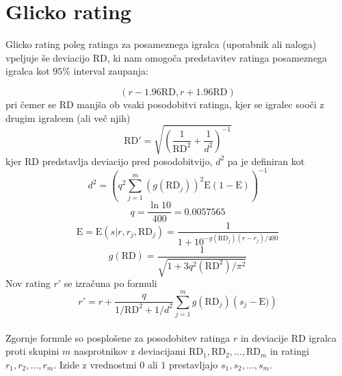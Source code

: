 \documentclass{IEEEtran}
\begin{document}
\section{Glicko rating}
\label{sec:glicko}
Glicko rating poleg ratinga za posameznega igralca (uporabnik ali naloga) vpeljuje še deviacijo $\mathrm{RD}$, ki nam omogoča predstavitev ratinga posameznega igralca kot $95\%$ interval zaupanja:

\begin{equation}
    \left ( r -1.96\mathrm{RD}, r +1.96\mathrm{RD} \right )
\end{equation}
pri čemer se $\mathrm{RD}$ manjša ob vsaki posodobitvi ratinga, kjer se igralec sooči z drugim igralcem (ali več njih)
\begin{equation}
    \mathrm{RD'}=\sqrt{\left (  \frac{1}{\mathrm{RD}^{2}} + \frac{1}{d^{2}}\right )^{-1}}
\end{equation}
kjer $\mathrm{RD}$ predstavlja deviacijo pred posodobitvijo, $d^{2}$ pa je definiran kot
\begin{equation}
    d^{2}=\left ( q^{2} \sum_{j=1}^{m} \left (g\left( \mathrm{RD}_{j} \right ) \right )^{2}\mathrm{E} \left (1-\mathrm{E} \right )\right )^{-1} 
\end{equation}
\begin{equation}
    q=\frac{\ln10}{400}=0.0057565
\end{equation}
\begin{equation}
    \mathrm{E}=\mathrm{E}\left ( s|r, r_{j}, \mathrm{RD}_{j} \right )=\frac{1}{1+10^{-g\left ( \mathrm{RD}_{j} \right )\left ( r-r_{j} \right )/400}}
\end{equation}
\begin{equation}
g\left ( \mathrm{RD} \right )=\frac{1}{\sqrt{1+3q^{2}\left ( \mathrm{RD}^{2} \right )/\pi^{2} }}
\end{equation}
\hfill
\newpage
Nov rating $r'$ se izračuna po formuli
\begin{equation}
    r'=r+\frac{q}{1/\mathrm{RD}^{2}+1/d^{2}}\sum_{j=1}^{m}g\left( \mathrm{RD}_{j} \right )\left (s_{j}-\mathrm{E}) \right )
\end{equation}
\hfill
\\
Zgornje formule so posplošene za posodobitev ratinga $r$ in deviacije $\mathrm{RD}$ igralca proti skupini $m$ nasprotnikov z deviacijami 
$\mathrm{RD}_{1}, \mathrm{RD}_{2}, ..., \mathrm{RD}_{m}$ in ratingi $r_{1}, r_{2}, ..., r_{m}$. Izide z vrednostmi $0$ ali $1$ prestavljajo $s_{1}, s_{2}, ..., s_{m}$.
\hfill
\\
\end{document}
